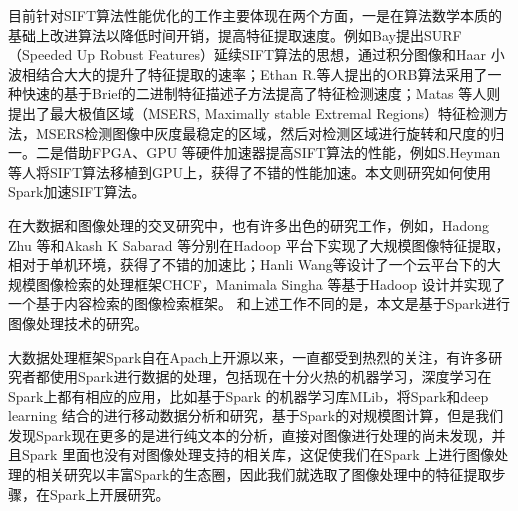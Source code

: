 目前针对SIFT算法性能优化的工作主要体现在两个方面，一是在算法数学本质的基础上改进算法以降低时间开销，提高特征提取速度。例如Bay提出SURF（Speeded Up Robust Features）延续SIFT算法的思想，通过积分图像和Haar 小波相结合大大的提升了特征提取的速率；Ethan R.等人提出的ORB算法采用了一种快速的基于Brief的二进制特征描述子方法提高了特征检测速度；Matas 等人则提出了最大极值区域（MSERS, Maximally stable Extremal Regions）特征检测方法，MSERS检测图像中灰度最稳定的区域，然后对检测区域进行旋转和尺度的归一。二是借助FPGA、GPU 等硬件加速器提高SIFT算法的性能，例如S.Heyman 等人将SIFT算法移植到GPU上，获得了不错的性能加速。本文则研究如何使用Spark加速SIFT算法。

在大数据和图像处理的交叉研究中，也有许多出色的研究工作，例如，Hadong Zhu 等和Akash K Sabarad 等分别在Hadoop 平台下实现了大规模图像特征提取，相对于单机环境，获得了不错的加速比；Hanli Wang等设计了一个云平台下的大规模图像检索的处理框架CHCF，Manimala Singha 等基于Hadoop 设计并实现了一个基于内容检索的图像检索框架。 和上述工作不同的是，本文是基于Spark进行图像处理技术的研究。

大数据处理框架Spark自在Apach上开源以来，一直都受到热烈的关注，有许多研究者都使用Spark进行数据的处理，包括现在十分火热的机器学习，深度学习在Spark上都有相应的应用，比如基于Spark 的机器学习库MLib，将Spark和deep learning 结合的进行移动数据分析和研究，基于Spark的对规模图计算，但是我们发现Spark现在更多的是进行纯文本的分析，直接对图像进行处理的尚未发现，并且Spark 里面也没有对图像处理支持的相关库，这促使我们在Spark 上进行图像处理的相关研究以丰富Spark的生态圈，因此我们就选取了图像处理中的特征提取步骤，在Spark上开展研究。

